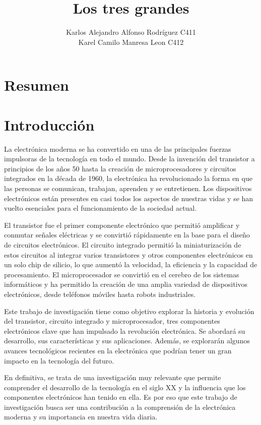 \documentclass{article}
\begin{document}
\title{Los tres grandes}
\author{Karlos Alejandro Alfonso Rodríguez C411\\Karel Camilo Manresa Leon C412}
\maketitle

\section*{Resumen}

\section*{Introducción}

La electrónica moderna se ha convertido en una de las principales fuerzas impulsoras de la tecnología
en todo el mundo. Desde la invención del transistor a principios de los años
50 hasta la creación de microprocesadores y circuitos integrados en la década de 1960, 
la electrónica ha revolucionado la forma en que las personas se comunican, trabajan, aprenden 
y se entretienen. Los dispositivos electrónicos están presentes en casi todos los aspectos de nuestras 
vidas y se han vuelto esenciales para el funcionamiento de la sociedad actual.

El transistor fue el primer componente electrónico que permitió amplificar y conmutar señales eléctricas
y se convirtió rápidamente en la base para el diseño de circuitos electrónicos. El circuito integrado 
permitió la miniaturización de estos circuitos al integrar varios transistores y otros componentes electrónicos
en un solo chip de silicio, lo que aumentó la velocidad, la eficiencia y la capacidad 
de procesamiento. El microprocesador se convirtió en el cerebro de los sistemas informáticos y ha permitido
la creación de una amplia variedad de dispositivos electrónicos, desde teléfonos móviles hasta 
robots industriales.

Este trabajo de investigación tiene como objetivo explorar la historia y evolución del transistor, 
circuito integrado y microprocesador, tres componentes electrónicos clave que han impulsado 
la revolución electrónica. Se abordará su desarrollo, sus características y sus aplicaciones. 
Además, se explorarán algunos avances tecnológicos recientes en la electrónica que podrían tener 
un gran impacto en la tecnología del futuro.

En definitiva, se trata de una investigación muy relevante que permite comprender el desarrollo de la tecnología
en el siglo XX y la influencia que los componentes electrónicos han tenido en ella. Es por eso 
que este trabajo de investigación busca ser una contribución a la comprensión de la electrónica moderna 
y su importancia en nuestra vida diaria.
\end{document}

